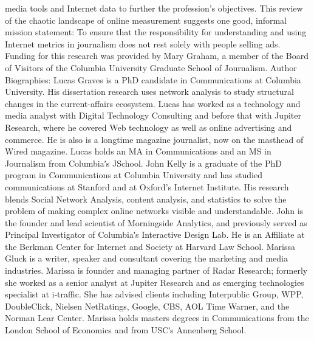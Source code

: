 media tools and Internet data to further the profession’s objectives. This
review of the chaotic landscape of online measurement suggests one good,
informal mission statement: To ensure that the responsibility for
understanding and using Internet metrics in journalism does not rest
solely with people selling ads.
Funding for this research was provided by Mary Graham, a member of
the Board of Visitors of the Columbia University Graduate School of
Journalism.
Author Biographies:
Lucas Graves is a PhD candidate in Communications at Columbia
University. His dissertation research uses network analysis to study
structural changes in the current‐affairs ecosystem. Lucas has worked as a
technology and media analyst with Digital Technology Consulting and
before that with Jupiter Research, where he covered Web technology as
well as online advertising and commerce. He is also is a longtime
magazine journalist, now on the masthead of Wired magazine. Lucas holds
an MA in Communications and an MS in Journalism from Columbiaʹs JSchool.
John Kelly is a graduate of the PhD program in Communications at
Columbia University and has studied communications at Stanford and at
Oxford’s Internet Institute. His research blends Social Network Analysis,
content analysis, and statistics to solve the problem of making complex
online networks visible and understandable. John is the founder and lead
scientist of Morningside Analytics, and previously served as Principal
Investigator of Columbiaʹs Interactive Design Lab. He is an Affiliate at the
Berkman Center for Internet and Society at Harvard Law School.
Marissa Gluck is a writer, speaker and consultant covering the marketing
and media industries. Marissa is founder and managing partner of Radar
Research; formerly she worked as a senior analyst at Jupiter Research and
as emerging technologies specialist at i‐traffic. She has advised clients
including Interpublic Group, WPP, DoubleClick, Nielsen NetRatings,
Google, CBS, AOL Time Warner, and the Norman Lear Center. Marissa
holds masters degrees in Communications from the London School of
Economics and from USCʹs Annenberg School.
